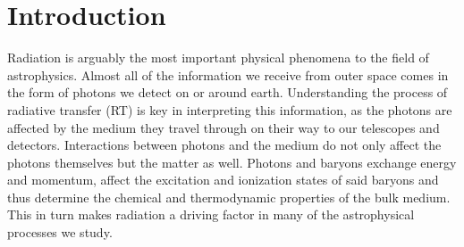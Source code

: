 \documentclass[fleq,usenatbib]{mnras}
\begin{document}
\section{Introduction}\label{sec:intr}
Radiation is arguably the most important physical phenomena to the field of
astrophysics. Almost all of the information we receive from outer space comes 
in the form of photons we detect on or around earth. Understanding the process 
of radiative transfer (RT) is key in interpreting this information, as the 
photons are affected by the medium they travel through on their way to our 
telescopes and detectors. Interactions between photons and the medium do not 
only affect the photons themselves but the matter as well. Photons and baryons 
exchange energy and momentum, affect the excitation and ionization states of 
said baryons and thus determine the chemical and thermodynamic properties of 
the bulk medium. This in turn makes radiation a driving factor in many of the 
astrophysical processes we study.
\end{document}
